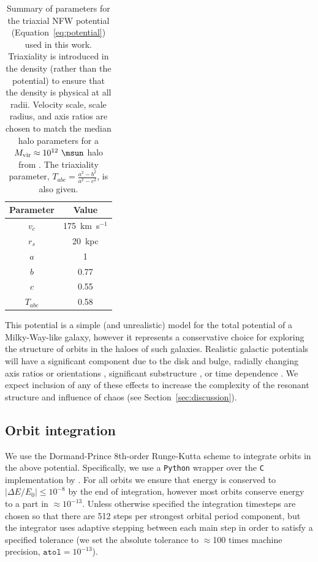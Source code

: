 \begin{table}[ht]
\begin{center}
	\begin{tabular}{ c  c }
	         Parameter & Value\\\toprule
		$v_c$ & 175~km~s$^{-1}$\\
		$r_s$ & 20~kpc\\
		$a$ & 1\\
		$b$ & 0.77\\
		$c$ & 0.55\\
		\midrule
		$T_{abc}$ & 0.58\\
		\bottomrule
		\end{tabular}
    \caption{Summary of parameters for the triaxial NFW potential
    (Equation~\ref{eq:potential}) used in this work. Triaxiality is introduced
    in the density (rather than the potential) to ensure that the density is
    physical at all radii. Velocity scale, scale radius, and axis ratios are
    chosen to match the median halo parameters for a $M_{\rm vir} \approx
    10^{12}~\msun$ halo from \citep{jing02}. The triaxiality parameter, $T_{abc}
    = \frac{a^2 - b^2}{a^2 - c^2}$, is also given. \label{tbl:potential}}
\end{center}
\end{table}

This potential is a simple (and unrealistic) model for the total potential of a
Milky-Way-like galaxy, however it represents a conservative choice for exploring
the structure of orbits in the haloes of such galaxies. Realistic galactic
potentials will have a significant component due to the disk and bulge, radially
changing axis ratios or orientations \citep[e.g.,][]{romanowsky98,
kazantzidis04,debattista08,veraciro11,butsky15}, significant substructure
\citep{moore98,zemp09}, or time dependence \citep[either from bulk rotation,
mass growth, mergers, etc.; see, e.g.,][]{bailin05}. We expect inclusion of any
of these effects to increase the complexity of the resonant structure and
influence of chaos (see Section~\ref{sec:discussion}).

\subsection{Orbit integration}\label{sec:integration}

We use the Dormand-Prince 8th-order Runge-Kutta scheme \citep{prince81} to
integrate orbits in the above potential. Specifically, we use a \texttt{Python}
wrapper over the \texttt{C} implementation by \cite{hairer93}. For all orbits we
ensure that energy is conserved to $|\Delta E/E_0| \leq 10^{-8}$ by the end of
integration, however most orbits conserve energy to a part in
$\approx$$10^{-13}$. Unless otherwise specified the integration timesteps are
chosen so that there are 512 steps per strongest orbital period component, but
the integrator uses adaptive stepping between each main step in order to satisfy
a specified tolerance (we set the absolute tolerance to $\approx$100 times
machine precision, $\texttt{atol} = 10^{-13}$).

